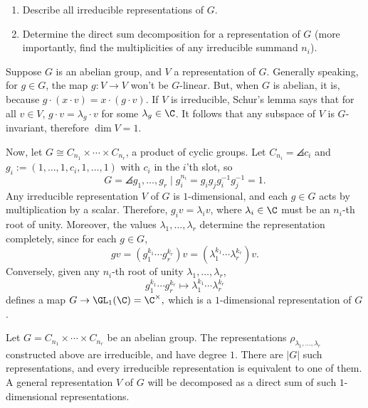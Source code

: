 \begin{notebox*}[Questions]
    \begin{enumerate}
        \item Describe all irreducible representations of  $G$.
        \item Determine the direct sum decomposition for a representation of $G$ (more importantly, find the multiplicities of any irreducible summand $n_i$).
    \end{enumerate}
\end{notebox*}

\begin{ex}
    Suppose $G$ is an abelian group, and $V$ a representation of $G$. Generally speaking, for $g \in G$, the map $g:V \to V$ won't be $G$-linear. But, when $G$ is abelian, it is, because $g\cdot (x \cdot v)=x\cdot (g\cdot v)$. If $V$ is irreducible, Schur's lemma says that for all $v \in V$, $g \cdot v = \lambda_g\cdot v$ for some $\lambda _g\in \C$. It follows that any subspace of $V$ is $G$-invariant, therefore $\dim V =1$.

    Now, let $G \cong C_{n_1}\times \cdots \times C_{n_r}$, a product of cyclic groups. Let $C_{n_i}=\angles {c_i}$ and $g_i:= (1,\dots,1,c_i,1,\dots,1)$ with $c_i$ in the $i$'th slot, so
    $$G=\angles{g_1,\dots,g_r \mid g_i^{n_i}=g_ig_jg_i^{-1}g_j^{-1}=1}.$$
    Any irreducible representation $V$ of $G$ is $1$-dimensional, and each $g\in G$ acts by multiplication by a scalar. Therefore, $g_iv=\lambda _iv$, where $\lambda_i \in \C$ must be an $n_i$-th root of unity. Moreover, the values $\lambda_1,\dots,\lambda_r$ determine the representation completely, since for each $g\in G$,
    $$gv=(g_1^{k_1}\cdots g_r^{k_r})v=(\lambda_1^{k_1}\cdots \lambda_r^{k_r})v.$$
    Conversely, given any $n_i$-th root of unity $\lambda_1,\dots,\lambda_r$,
    $$g_1^{k_1}\cdots g_r^{k_r}\mapsto \lambda_1^{k_1}\cdots \lambda _r^{k_r}$$
    defines a map $G \to \GL_1(\C) =\C^\times,$ which is a $1$-dimensional representation of $G$.
\end{ex}

\begin{thm}
    Let $G = C_{n_1}\times \cdots \times C_{n_r}$ be an abelian group. The representations $\rho_{\lambda_1,\dots,\lambda_r}$ constructed above are irreducible, and have degree $1$. There are $|G|$ such representations, and every irreducible representation is equivalent to one of them. A general representation $V$ of $G$ will be decomposed as a direct sum of such $1$-dimensional representations.
\end{thm}

